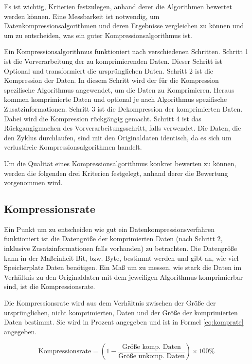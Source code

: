 \documentclass[conference]{IEEEtran}
\begin{document}
Es ist wichtig, Kriterien festzulegen, anhand derer die Algorithmen bewertet werden können.
Eine Messbarkeit ist notwendig, um Datenkompressionsalgorithmen und deren Ergebnisse
vergleichen zu können und um zu entscheiden, was ein guter Kompressionsalgorithmus ist.

Ein Kompressionsalgorithmus funktioniert nach verschiedenen Schritten.
Schritt 1 ist die Vorverarbeitung der zu komprimierenden Daten.
Dieser Schritt ist Optional und transformiert die ursprünglichen Daten.
Schritt 2 ist die Kompression der Daten.
In diesem Schritt wird der für die Kompression spezifische Algorithmus angewendet,
um die Daten zu Komprimieren.
Heraus kommen komprimierte Daten und optional je nach Algorithmus
spezifische Zusatzinformationen.
Schritt 3 ist die Dekompression der komprimierten Daten.
Dabei wird die Kompression rückgängig gemacht.
Schritt 4 ist das Rückgangigmachen des Vorverarbeitungsschritt, falls verwendet.
Die Daten, die den Zyklus durchlaufen, sind mit den Originaldaten identisch,
da es sich um verlustfreie Kompressionsalgorithmen handelt.

Um die Qualität eines Kompressionsalgorithmus konkret bewerten zu können, werden
die folgenden drei Kriterien festgelegt, anhand derer die Bewertung vorgenommen wird.

\subsection{Kompressionsrate}

Ein Punkt um zu entscheiden wie gut ein Datenkompressionsverfahren
funktioniert ist die Datengröße der komprimierten Daten (nach Schritt 2, inklusive
Zusatzinformationen falls vorhanden) zu betrachten.
Die Datengröße kann in der Maßeinheit Bit, bzw. Byte, bestimmt werden und gibt an,
wie viel Speicherplatz Daten benötigen.
Ein Maß um zu messen, wie stark die Daten im Verhältnis zu den Originaldaten mit dem
jeweiligen Algorithmus komprimierbar sind, ist die Kompressionsrate.

Die Kompressionsrate wird aus dem Verhältnis zwischen der Größe der ursprünglichen,
nicht komprimierten, Daten und der Größe der komprimierten Daten bestimmt.
Sie wird in Prozent angegeben und ist in Formel \ref{eq:komprate} angegeben.

\begin{equation}
  \label{eq:komprate}
  \text{Kompressionsrate} = \left(1 - \frac{\text{Größe komp. Daten}}{\text{Größe unkomp. Daten}}\right) \times 100 \%
\end{equation}
\end{document}
